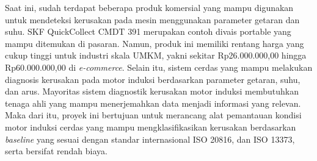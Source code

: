 \documentclass{elsinta}
\begin{document}
Saat ini, sudah terdapat beberapa produk komersial
yang mampu digunakan untuk mendeteksi kerusakan pada mesin
menggunakan parameter getaran dan suhu. SKF QuickCollect CMDT 391
merupakan contoh divais portable yang mampu ditemukan
di pasaran\cite{SKFGroup2021}. Namun, produk ini
memiliki rentang harga yang cukup tinggi untuk industri
skala UMKM, yakni sekitar
Rp26.000.000,00 hingga Rp60.000.000,00 di \textit{e-commerce}.
Selain itu, sistem cerdas yang mampu melakukan diagnosis
kerusakan pada motor induksi berdasarkan parameter getaran, suhu,
dan arus. Mayoritas sistem diagnostik kerusakan motor induksi
membutuhkan tenaga ahli yang mampu menerjemahkan data menjadi informasi yang relevan.
Maka dari itu, proyek ini bertujuan untuk merancang alat 
pemantauan kondisi motor induksi cerdas yang mampu mengklasifikasikan
kerusakan berdasarkan \textit{baseline} yang sesuai dengan
standar internasional ISO 20816, dan ISO 13373, serta bersifat rendah biaya.
\end{document}

